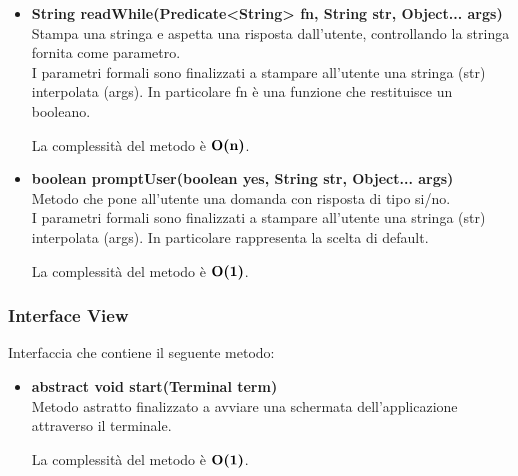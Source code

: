 \documentclass[a4paper, 12pt]{scrreprt}
\begin{document}
\begin{itemize}
					La complessit\`a del metodo \`e $\bigO\textbf{(1)}$.
					
					\item \textbf{String readWhile(Predicate<String> fn, String str, Object... args)}
					\\Stampa una stringa e aspetta una risposta dall'utente, controllando la stringa fornita come parametro.
					\\I parametri formali sono finalizzati a stampare all'utente una stringa (str) interpolata (args). In particolare fn \`e una funzione che restituisce un booleano.
					
					La complessit\`a del metodo \`e $\mathbf{O}\textbf{(n)}$.
	
					\item \textbf{boolean promptUser(boolean yes, String str, Object... args)}
					\\Metodo che pone all'utente una domanda con risposta di tipo si/no.
					\\I parametri formali sono finalizzati a stampare all'utente una stringa (str) interpolata (args). In particolare rappresenta la scelta di default.
					
					La complessit\`a del metodo \`e $\bigO\textbf{(1)}$.
					
				\end{itemize}

				\subsubsection{Interface View}
				Interfaccia che contiene il seguente metodo:
				\begin{itemize}
					\item \textbf{abstract void start(Terminal term)}
					\\Metodo astratto finalizzato a avviare una schermata dell'applicazione attraverso il terminale.
					
					La complessit\`a del metodo \`e $\bigO\textbf{(1)}$.
				\end{itemize}
\end{document}
